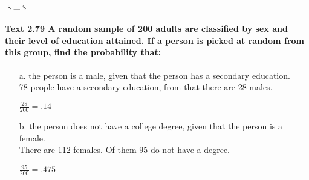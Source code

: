 \documentclass{article}
\begin{document}
\begin{center}
$\upvarsigma$\_$\upvarsigma$
\end{center}

\pagebreak

\paragraph{Text 2.79 A random sample of 200 adults are classified by sex and
their level of education attained. If a person is picked at random from this 
group, find the probability that:\\}
\begin{enumerate}
\item[a.] the person is a male, given that the person has a secondary 
education.\\
78 people have a secondary education, from that there are 28 males.
\begin{center}
$\boxed{\frac{28}{200} = .14}$
\end{center}

\item[b.] the person does not have a college degree, given that the person is a 
female.\\
There are 112 females. Of them 95 do not have a degree.
\begin{center}
$\boxed{\frac{95}{200} = .475}$
\end{center}
\end{enumerate}
\end{document}
